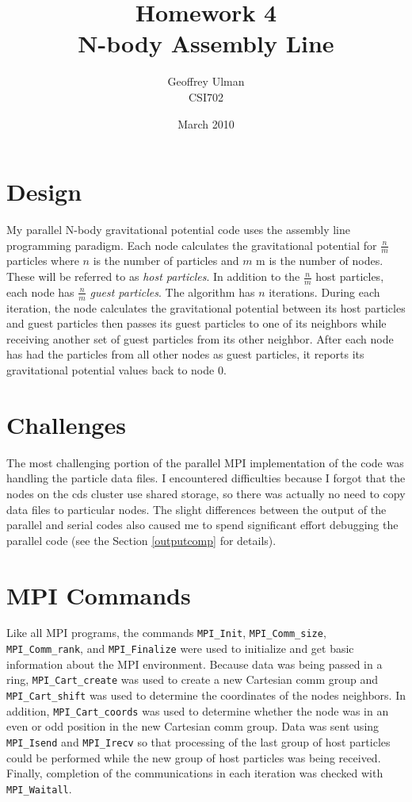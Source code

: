 \documentclass{article}
\begin{document}
\title{Homework 4\\
       N-body Assembly Line}
\author{Geoffrey Ulman\\
        CSI702}
\date{March 2010}
\maketitle

\section{Design}
My parallel N-body gravitational potential code uses the assembly line programming paradigm. Each node calculates the gravitational potential for \( \frac{n}{m} \) particles where \( n \) is the number of particles and \( m \) m is the number of nodes. These will be referred to as \emph{host particles}. In addition to the \( \frac{n}{m} \) host particles, each node has \( \frac{n}{m} \) \emph{guest particles}. The algorithm has \( n \) iterations.
During each iteration, the node calculates the gravitational potential between its host particles and guest particles then passes its guest particles to one of its neighbors while receiving another set of guest particles from its other neighbor. After each node has had the particles from all other nodes as guest particles, it reports its gravitational potential values back to node 0.

\section{Challenges}
The most challenging portion of the parallel MPI implementation of the code was handling the particle data files. I encountered difficulties because I forgot that the nodes on the cds cluster use shared storage, so there was actually no need to copy data files to particular nodes. The slight differences between the output of the parallel and serial codes also caused me to spend significant effort debugging the parallel code (see the Section \ref{outputcomp} for details).

\section{MPI Commands}
Like all MPI programs, the commands \verb!MPI_Init!, \verb!MPI_Comm_size!, \verb!MPI_Comm_rank!, and \verb!MPI_Finalize! were used to initialize and get basic information about the MPI environment. Because data was being passed in a ring, \verb!MPI_Cart_create! was used to create a new Cartesian comm group and \verb!MPI_Cart_shift! was used to determine the coordinates of the nodes neighbors. In addition, \verb!MPI_Cart_coords! was used to determine whether the node was in an even or odd position in the new Cartesian comm group. Data was sent using \verb!MPI_Isend! and \verb!MPI_Irecv! so that processing of the last group of host particles could be performed while the new group of host particles was being received. Finally, completion of the communications in each iteration was checked with \verb!MPI_Waitall!.
\end{document}
